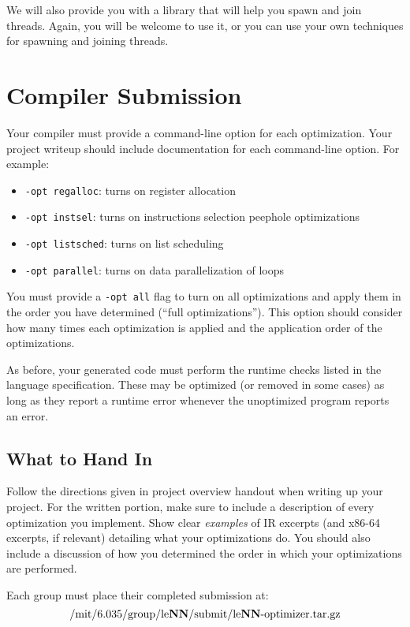 We will also provide you with a library that will help you spawn and
join threads. Again, you will be welcome to use it, or you can use
your own techniques for spawning and joining threads.

\section*{Compiler Submission}

Your compiler must provide a command-line option for each optimization.
Your project writeup should include documentation for each
command-line option.  For example:

\begin{itemize}

\item {\tt -opt regalloc}: turns on register allocation
\item {\tt -opt instsel}: turns on instructions selection peephole
optimizations
\item {\tt -opt listsched}: turns on list scheduling
\item {\tt -opt parallel}: turns on data parallelization of loops

\end{itemize}

You must provide a {\tt -opt all} flag to turn on all optimizations
and apply them in the order you have determined (``full
optimizations'').  This option should consider how many times each
optimization is applied and the application order of the
optimizations.

As before, your generated code must perform the runtime checks listed
in the language specification.  These may be optimized (or removed in
some cases) as long as they report a runtime error whenever the
unoptimized program reports an error.

\subsection*{What to Hand In}

Follow the directions given in project overview handout when writing up
your project.  For the written portion, make sure to include a description of
every optimization you implement.  Show clear {\em examples} of IR excerpts
(and x86-64 excerpts, if relevant) detailing what your optimizations do.
You should also include a discussion of how you determined the order in
which your optimizations are performed.

Each group must place their completed submission at:\[
\mbox{/mit/6.035/group/le{\bf NN}/submit/le{\bf NN}-optimizer.tar.gz}
\]

